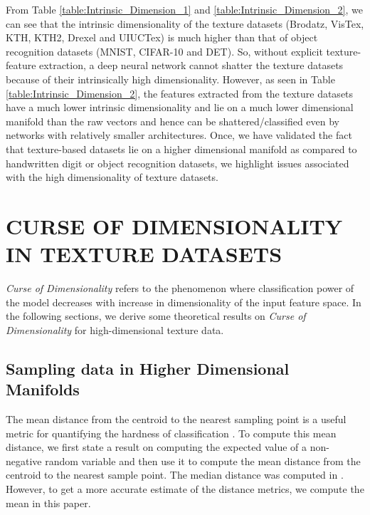 \documentclass[11pt,a4paper]{article}
\begin{document}
From Table \ref{table:Intrinsic_Dimension_1} and \ref{table:Intrinsic_Dimension_2}, we can see that the intrinsic dimensionality of the texture datasets (Brodatz, VisTex, KTH, KTH2, Drexel and UIUCTex) is much higher than that of object recognition datasets (MNIST, CIFAR-10 and DET). So, without explicit texture-feature extraction, a deep neural network cannot shatter the texture datasets because of their intrinsically high dimensionality. However, as seen in Table \ref{table:Intrinsic_Dimension_2}, the features extracted from the texture datasets have a much lower intrinsic dimensionality and lie on a much lower dimensional manifold than the raw vectors and hence can be shattered/classified even by networks with relatively smaller architectures. Once, we have validated the fact that texture-based datasets lie on a higher dimensional manifold as compared to handwritten digit or object recognition datasets, we highlight issues associated with the high dimensionality of texture datasets. 

\section{CURSE OF DIMENSIONALITY IN TEXTURE DATASETS}
\emph{Curse of Dimensionality} refers to the phenomenon where classification power of the model decreases with increase in dimensionality of the input feature space. In the following sections, we derive some theoretical results on \emph{Curse of Dimensionality} for high-dimensional texture data.

\subsection{Sampling data in Higher Dimensional Manifolds}

The mean distance from the centroid to the nearest sampling point is a useful metric for quantifying the hardness of classification \cite{hastie01statisticallearning}. To compute this mean distance, we first state a result on computing the expected value of a non-negative random variable and then use it to compute the mean distance from the centroid to the nearest sample point. The median distance was computed in \cite{hastie01statisticallearning}. However, to get a more accurate estimate of the distance metrics, we compute the mean in this paper.    
\end{document}
